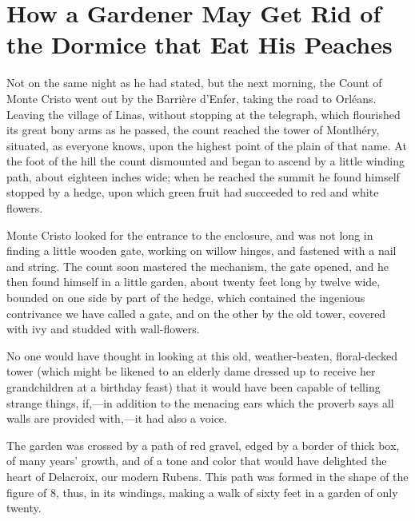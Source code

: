 \chapter{How a Gardener May Get Rid of the Dormice that Eat His Peaches}

Not on the same night as he had stated, but the next morning, the Count
of Monte Cristo went out by the Barrière d’Enfer, taking the road to
Orléans. Leaving the village of Linas, without stopping at the
telegraph, which flourished its great bony arms as he passed, the count
reached the tower of Montlhéry, situated, as everyone knows, upon the
highest point of the plain of that name. At the foot of the hill the
count dismounted and began to ascend by a little winding path, about
eighteen inches wide; when he reached the summit he found himself
stopped by a hedge, upon which green fruit had succeeded to red and
white flowers.

Monte Cristo looked for the entrance to the enclosure, and was not long
in finding a little wooden gate, working on willow hinges, and fastened
with a nail and string. The count soon mastered the mechanism, the gate
opened, and he then found himself in a little garden, about twenty feet
long by twelve wide, bounded on one side by part of the hedge, which
contained the ingenious contrivance we have called a gate, and on the
other by the old tower, covered with ivy and studded with wall-flowers.

No one would have thought in looking at this old, weather-beaten,
floral-decked tower (which might be likened to an elderly dame dressed
up to receive her grandchildren at a birthday feast) that it would have
been capable of telling strange things, if,—in addition to the menacing
ears which the proverb says all walls are provided with,—it had also a
voice.

The garden was crossed by a path of red gravel, edged by a border of
thick box, of many years’ growth, and of a tone and color that would
have delighted the heart of Delacroix, our modern Rubens. This path was
formed in the shape of the figure of 8, thus, in its windings, making a
walk of sixty feet in a garden of only twenty.

